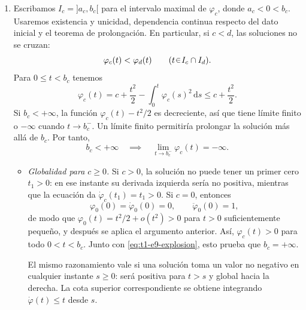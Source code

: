 \begin{sol}
\begin{enumerate}[label = (\alph*)]
    \item Escribamos $I_c={]a_c,b_c[}$ para el intervalo maximal de $\varphi_c$, donde $a_c<0<b_c$. Usaremos existencia y unicidad, dependencia continua respecto del dato inicial y el teorema de prolongación. En particular, si $c<d$, las soluciones no se cruzan:
    \[
        \varphi_c(t)<\varphi_d(t)\qquad(t\en I_c\cap I_d).
    \]
    Para $0\leq t<b_c$ tenemos
    \begin{equation}\label{eq:t1-e9-cota-superior}
        \varphi_c(t)
        =c+\frac{t^2}{2}-\int_0^t\varphi_c(s)^2\,\mathrm{d}s
        \leq c+\frac{t^2}{2}.
    \end{equation}
    Si $b_c<+\infty$, la función $\varphi_c(t)-t^2/2$ es decreciente, así que tiene límite finito o $-\infty$ cuando $t\to b_c^-$. Un límite finito permitiría prolongar la solución más allá de $b_c$. Por tanto,
    \begin{equation}\label{eq:t1-e9-explosion}
        b_c<+\infty
        \quad\implies\quad
        \lim_{t\to b_c^-}\varphi_c(t)=-\infty.
    \end{equation}

    \begin{itemize}
        \item \emph{Globalidad para $c\geq0$.}
        Si $c>0$, la solución no puede tener un primer cero $t_1>0$: en ese instante su derivada izquierda sería no positiva, mientras que la ecuación da $\dot\varphi_c(t_1)=t_1>0$. Si $c=0$, entonces
        \[
            \varphi_0(0)=\dot\varphi_0(0)=0,\qquad
            \ddot\varphi_0(0)=1,
        \]
        de modo que $\varphi_0(t)=t^2/2+o(t^2)>0$ para $t>0$ suficientemente pequeño, y después se aplica el argumento anterior. Así, $\varphi_c(t)>0$ para todo $0<t<b_c$. Junto con \eqref{eq:t1-e9-explosion}, esto prueba que $b_c=+\infty$.

        El mismo razonamiento vale si una solución toma un valor no negativo en cualquier instante $s\geq0$: será positiva para $t>s$ y global hacia la derecha. La cota superior correspondiente se obtiene integrando $\dot\varphi(t)\leq t$ desde $s$.


\end{itemize}
\end{enumerate}
\end{sol}
